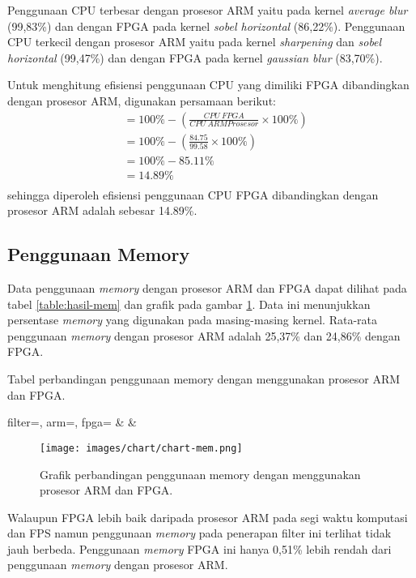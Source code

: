 
Penggunaan CPU terbesar dengan prosesor ARM yaitu pada kernel \textit{average blur} (99,83\%) dan dengan FPGA pada kernel \textit{sobel horizontal} (86,22\%). Penggunaan CPU terkecil dengan prosesor ARM yaitu pada kernel \textit{sharpening} dan \textit{sobel horizontal} (99,47\%) dan dengan FPGA pada kernel \textit{gaussian blur} (83,70\%).

Untuk menghitung efisiensi penggunaan CPU yang dimiliki FPGA dibandingkan dengan prosesor ARM, digunakan persamaan berikut:
\begin{equation*}
    \begin{split}
& = 100\% - \left( \frac{CPU\ FPGA}{CPU\ ARM Prosesor} \times 100\% \right) \\
& = 100\% - \left( \frac{84.75}{99.58} \times 100\% \right) \\
& = 100\% - 85.11\% \\
& = 14.89\% \\
    \end{split}
\end{equation*}
sehingga diperoleh efisiensi penggunaan CPU FPGA dibandingkan dengan prosesor ARM adalah sebesar 14.89\%.

\subsection{Penggunaan Memory}
Data penggunaan \textit{memory} dengan prosesor ARM dan FPGA dapat dilihat pada tabel \ref{table:hasil-mem} dan grafik pada gambar \ref{fig:chart-mem}. Data ini menunjukkan persentase \textit{memory} yang digunakan pada masing-masing kernel. Rata-rata penggunaan \textit{memory} dengan prosesor ARM adalah 25,37\% dan 24,86\% dengan FPGA. 
\begin{atable}
    \caption{Tabel perbandingan penggunaan memory dengan menggunakan prosesor ARM dan FPGA.}
    \label{table:hasil-mem}
        {
            filter=\filter, 
            arm=\arm, 
            fpga=\fpga}
        {
            \filter & 
            \arm & 
            \fpga }
\end{atable}
\begin{figure}[H]
    \texttt{[image: images/chart/chart-mem.png]}
    \caption{Grafik perbandingan penggunaan memory dengan menggunakan prosesor ARM dan FPGA.}
    \label{fig:chart-mem}
\end{figure}
Walaupun FPGA lebih baik daripada prosesor ARM pada segi waktu komputasi dan FPS namun penggunaan \textit{memory} pada penerapan filter ini terlihat tidak jauh berbeda. Penggunaan \textit{memory} FPGA ini hanya 0,51\% lebih rendah dari penggunaan \textit{memory} dengan prosesor ARM.

